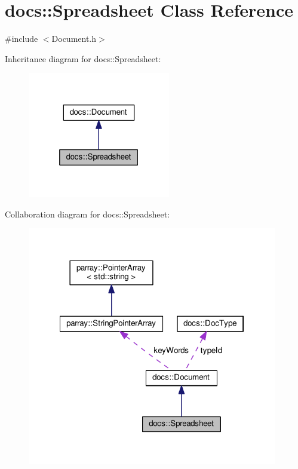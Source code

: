 \hypertarget{classdocs_1_1Spreadsheet}{\section{docs\-:\-:Spreadsheet Class Reference}
\label{classdocs_1_1Spreadsheet}
}


{\ttfamily \#include $<$Document.\-h$>$}



Inheritance diagram for docs\-:\-:Spreadsheet\-:\nopagebreak
\begin{figure}[H]
\begin{center}
\leavevmode
\includegraphics[width=176pt]{classdocs_1_1Spreadsheet__inherit__graph}
\end{center}
\end{figure}


Collaboration diagram for docs\-:\-:Spreadsheet\-:\nopagebreak
\begin{figure}[H]
\begin{center}
\leavevmode
\includegraphics[width=309pt]{classdocs_1_1Spreadsheet__coll__graph}
\end{center}
\end{figure}
